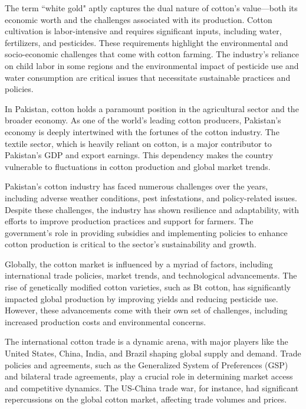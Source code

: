 \documentclass[12pt]{article}
\begin{document}
The term ``white gold" aptly captures the dual nature of cotton's value—both its economic worth and the challenges associated with its production. Cotton cultivation is labor-intensive and requires significant inputs, including water, fertilizers, and pesticides. These requirements highlight the environmental and socio-economic challenges that come with cotton farming. The industry's reliance on child labor in some regions and the environmental impact of pesticide use and water consumption are critical issues that necessitate sustainable practices and policies.

In Pakistan, cotton holds a paramount position in the agricultural sector and the broader economy. As one of the world's leading cotton producers, Pakistan's economy is deeply intertwined with the fortunes of the cotton industry. The textile sector, which is heavily reliant on cotton, is a major contributor to Pakistan's GDP and export earnings. This dependency makes the country vulnerable to fluctuations in cotton production and global market trends.

Pakistan's cotton industry has faced numerous challenges over the years, including adverse weather conditions, pest infestations, and policy-related issues. Despite these challenges, the industry has shown resilience and adaptability, with efforts to improve production practices and support for farmers. The government's role in providing subsidies and implementing policies to enhance cotton production is critical to the sector's sustainability and growth.

Globally, the cotton market is influenced by a myriad of factors, including international trade policies, market trends, and technological advancements. The rise of genetically modified cotton varieties, such as Bt cotton, has significantly impacted global production by improving yields and reducing pesticide use. However, these advancements come with their own set of challenges, including increased production costs and environmental concerns.

The international cotton trade is a dynamic arena, with major players like the United States, China, India, and Brazil shaping global supply and demand. Trade policies and agreements, such as the Generalized System of Preferences (GSP) and bilateral trade agreements, play a crucial role in determining market access and competitive dynamics. The US-China trade war, for instance, had significant repercussions on the global cotton market, affecting trade volumes and prices.
\end{document}
